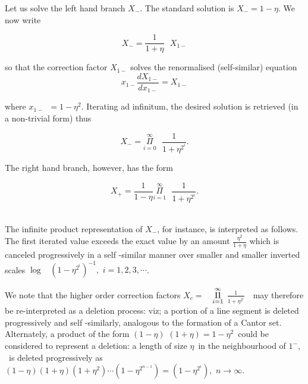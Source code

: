 \documentclass[12pt]{article}
\begin{document}
Let us solve the left hand branch $X_{-}$. The standard solution is $%
X_{-}=1-\eta $. We now write

\begin{equation}\label{eq19}
X_{-}=\frac{1}{1+\eta }\text{ }X_{1-}
\end{equation}%

\noindent so that the correction factor $X_{1-}$ solves the renormalised
(self-similar) equation%
\begin{equation}\label{eq20}
x_{1-}\frac{dX_{1-}}{dx_{1-}}=X_{1-}
\end{equation}

\noindent where $x_{1-}$\ $=1-\eta ^{2}.$ Iterating ad infinitum, the desired solution
is retrieved (in a non-trivial form) thus

\begin{equation}\label{eq21}
X_{-}=\overset{\infty }{\underset{i=0}{\Pi }}\text{ }\frac{1}{1+\eta ^{2^{i}}}.
\end{equation}

The right hand branch, however, has the form 

\begin{equation}\label{eq22}
X_{+}=\frac{1}{1-\eta }\overset{\infty }{\underset{i=1}{\Pi }}\text{ }\frac{1%
}{1+\eta ^{2^{i}}}.
\end{equation}%
\ 

\bigskip The infinite product representation of $X_{-}$, for instance, is
interpreted as follows. The first iterated value exceeds the exact value by
an amount $\frac{\eta ^{2}}{1 + \eta }$ which is canceled progressively in
a self -similar manner over smaller and smaller inverted scales $\log $ \ $%
\left( 1-\eta ^{2^{i}}\right) ^{-1},$ $i=1,2,3,\cdots $.

\vspace{.25cm}

We note that the higher order correction factors $X_{c}=$\ \ $\overset{%
\infty }{\underset{i=1}{\Pi }}$ $\frac{1}{1+\eta ^{2^{i}}}$\ \ may therefore be
re-interpreted as a deletion process: viz; a portion of a line segment is
deleted progressively and self -similarly, analogous to the formation of a
Cantor set. Alternately, a product of the form $(1-\eta )$ $(1+\eta )=1-\eta
^{2}$\  could be considered to represent a deletion: a length of
size $\eta $\ in the neighbourhood of $1^{-},$\ is deleted progressively as $%
(1-\eta )(1+\eta )(1+\eta ^{2})\cdots \left( 1-\eta ^{2^{n-1}}\right)
=\left( 1-\eta ^{2^{i}}\right) ,$ $n\rightarrow \infty$.
\end{document}
